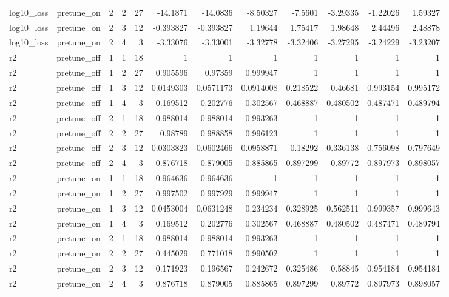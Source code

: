 \begin{table}[htbp]
\begin{tabular}{lrrrrrrrrrrr}
log10\_loss & pretune\_on & 2 & 2 & 27 & -14.1871 & -14.0836 & -8.50327 & -7.5601 & -3.29335 & -1.22026 & 1.59327 \\
log10\_loss & pretune\_on & 2 & 3 & 12 & -0.393827 & -0.393827 & 1.19644 & 1.75417 & 1.98648 & 2.44496 & 2.48878 \\
log10\_loss & pretune\_on & 2 & 4 & 3 & -3.33076 & -3.33001 & -3.32778 & -3.32406 & -3.27295 & -3.24229 & -3.23207 \\
r2 & pretune\_off & 1 & 1 & 18 & 1 & 1 & 1 & 1 & 1 & 1 & 1 \\
r2 & pretune\_off & 1 & 2 & 27 & 0.905596 & 0.97359 & 0.999947 & 1 & 1 & 1 & 1 \\
r2 & pretune\_off & 1 & 3 & 12 & 0.0149303 & 0.0571173 & 0.0914008 & 0.218522 & 0.46681 & 0.993154 & 0.995172 \\
r2 & pretune\_off & 1 & 4 & 3 & 0.169512 & 0.202776 & 0.302567 & 0.468887 & 0.480502 & 0.487471 & 0.489794 \\
r2 & pretune\_off & 2 & 1 & 18 & 0.988014 & 0.988014 & 0.993263 & 1 & 1 & 1 & 1 \\
r2 & pretune\_off & 2 & 2 & 27 & 0.98789 & 0.988858 & 0.996123 & 1 & 1 & 1 & 1 \\
r2 & pretune\_off & 2 & 3 & 12 & 0.0303823 & 0.0602466 & 0.0958871 & 0.18292 & 0.336138 & 0.756098 & 0.797649 \\
r2 & pretune\_off & 2 & 4 & 3 & 0.876718 & 0.879005 & 0.885865 & 0.897299 & 0.89772 & 0.897973 & 0.898057 \\
r2 & pretune\_on & 1 & 1 & 18 & -0.964636 & -0.964636 & 1 & 1 & 1 & 1 & 1 \\
r2 & pretune\_on & 1 & 2 & 27 & 0.997502 & 0.997929 & 0.999947 & 1 & 1 & 1 & 1 \\
r2 & pretune\_on & 1 & 3 & 12 & 0.0453004 & 0.0631248 & 0.234234 & 0.328925 & 0.562511 & 0.999357 & 0.999643 \\
r2 & pretune\_on & 1 & 4 & 3 & 0.169512 & 0.202776 & 0.302567 & 0.468887 & 0.480502 & 0.487471 & 0.489794 \\
r2 & pretune\_on & 2 & 1 & 18 & 0.988014 & 0.988014 & 0.993263 & 1 & 1 & 1 & 1 \\
r2 & pretune\_on & 2 & 2 & 27 & 0.445029 & 0.771018 & 0.990502 & 1 & 1 & 1 & 1 \\
r2 & pretune\_on & 2 & 3 & 12 & 0.171923 & 0.196567 & 0.242672 & 0.325486 & 0.58845 & 0.954184 & 0.954184 \\
r2 & pretune\_on & 2 & 4 & 3 & 0.876718 & 0.879005 & 0.885865 & 0.897299 & 0.89772 & 0.897973 & 0.898057 \\
\bottomrule
\end{tabular}
\end{table}
